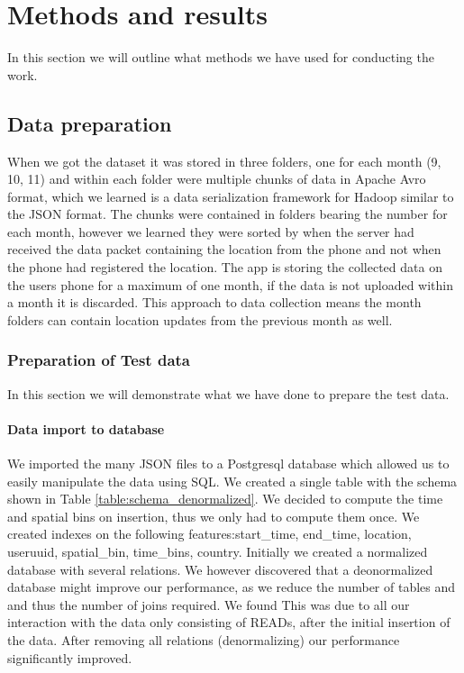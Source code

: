 \chapter{Methods and results}
\label{chap:methods_and_results}

In this section we will outline what methods we have used for conducting the work.
\section{Data preparation}

When we got the dataset it was stored in three folders, one for each month (9, 10, 11) and within each folder were multiple chunks of data in Apache Avro format\cite{apacheavro}, which we learned is a data serialization framework for Hadoop similar to the JSON format. The chunks were contained in folders bearing the number for each month, however we learned they were sorted by when the server had received the data packet containing the location from the phone and not when the phone had registered the location. The app is storing the collected data on the users phone for a maximum of one month, if the data is not uploaded within a month it is discarded. This approach to data collection means the month folders can contain location updates from the previous month as well.


\subsection{Preparation of Test data}
In this section we will demonstrate what we have done to prepare the test data.

\subsubsection{Data import to database}
We imported the many JSON files to a Postgresql database which allowed us to easily manipulate the data using SQL. We created a single table with the schema shown in Table \ref{table:schema_denormalized}. We decided to compute the time and spatial bins on insertion, thus we only had to compute them once. We created indexes on the following features:start\_time, end\_time, location, useruuid, spatial\_bin, time\_bins, country.
Initially we created a normalized database with several relations. We however discovered that a deonormalized database might improve our performance, as we reduce the number of tables and and thus the number of joins required\cite{sanders2001denormalization}. We found This was due to all our interaction with the data only consisting of READs, after the initial insertion of the data. After removing all relations (denormalizing) our performance significantly improved.

